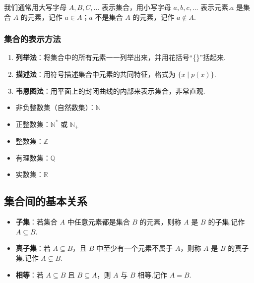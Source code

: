 	我们通常用大写字母 $A, B, C, \dots$ 表示集合，用小写字母 $a, b, c, \dots$ 表示元素.$a$ 是集合 $A$ 的元素，记作 $a \in A$；$a$ 不是集合 $A$ 的元素，记作 $a \notin A$.
	
	\subsubsection{集合的表示方法}
	\begin{enumerate}
		\item \textbf{列举法}：将集合中的所有元素一一列举出来，并用花括号“\{\}”括起来.
		\item \textbf{描述法}：用符号描述集合中元素的共同特征，格式为 $\{x \mid p(x)\}$.
		\item \textbf{韦恩图法}：用平面上的封闭曲线的内部来表示集合，非常直观.
	\end{enumerate}
	
	\begin{property}[常用数集] \label{property:common_sets}
		\begin{itemize}
			\item 非负整数集（自然数集）：$\mathbb{N}$
			\item 正整数集：$\mathbb{N}^*$ 或 $\mathbb{N}_+$
			\item 整数集：$\mathbb{Z}$
			\item 有理数集：$\mathbb{Q}$
			\item 实数集：$\mathbb{R}$
		\end{itemize}
	\end{property}
	
	\subsection{集合间的基本关系}
	
	\begin{definition}[子集与相等] \label{def:subset}
		\begin{itemize}
			\item \textbf{子集}：若集合 $A$ 中任意元素都是集合 $B$ 的元素，则称 $A$ 是 $B$ 的子集.记作 $A \subseteq B$.
			\item \textbf{真子集}：若 $A \subseteq B$，且 $B$ 中至少有一个元素不属于 $A$，则称 $A$ 是 $B$ 的真子集.记作 $A \subsetneq B$.
			\item \textbf{相等}：若 $A \subseteq B$ 且 $B \subseteq A$，则 $A$ 与 $B$ 相等.记作 $A=B$.
		\end{itemize}
	\end{definition}
	
